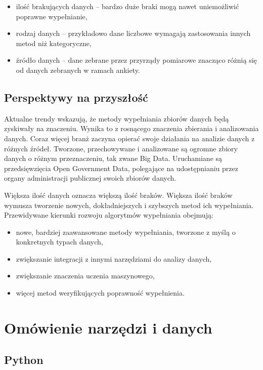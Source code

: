 \documentclass[12pt,twoside]{article}
\begin{document}
\begin{itemize}[label=-,labelsep=0.4cm, leftmargin=1.25cm]
    \item ilość brakujących danych -- bardzo duże braki mogą nawet uniemożliwić poprawne wypełnianie,
    \item rodzaj danych -- przykładowo dane liczbowe wymagają zastosowania innych metod niż kategoryczne,
    \item źródło danych -- dane zebrane przez przyrządy pomiarowe znacząco różnią się
          od danych zebranych w ramach ankiety.
\end{itemize}
\subsection{Perspektywy na przyszłość}

Aktualne trendy wskazują, że metody wypełniania zbiorów danych będą zyskiwały na znaczeniu.
Wynika to z rosnącego znaczenia zbierania i analizowania danych. Coraz więcej branż zaczyna opierać swoje działania
na analizie danych z różnych źródeł.
Tworzone, przechowywane i analizowane są ogromne zbiory danych o różnym przeznaczeniu, tak zwane Big Data. \cite{bigata}
Uruchamiane są przedsięwzięcia Open Government Data, polegające na udostępnianiu przez organy administracji publicznej
swoich zbiorów danych. \cite{ogd} \cite{ogdpl}

Większa ilość danych oznacza większą ilość braków. Większa ilość braków wymusza tworzenie nowych,
dokładniejszych i szybszych metod ich wypełniania. Przewidywane kierunki rozwoju algorytmów wypełniania obejmują: \cite{future}

\begin{itemize}[label=-,labelsep=0.4cm, leftmargin=1.25cm]
    \item nowe, bardziej zaawansowane metody wypełniania, tworzone z myślą o konkretnych typach danych,
    \item zwiększanie integracji z innymi narzędziami do analizy danych,
    \item zwiększanie znaczenia uczenia maszynowego,
    \item więcej metod weryfikujących poprawność wypełnienia.
\end{itemize}

\clearpage
\section{Omówienie narzędzi i danych}

\subsection{Python}
\end{document}
